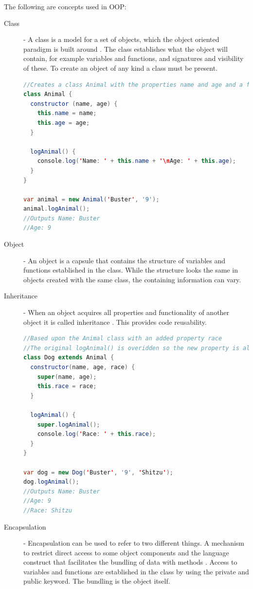 \documentclass {article}
\begin{document}
The following are concepts used in OOP:
\begin{description}
\item [Class] - A class is a model for a set of objects, which the object oriented paradigm is built around \cite{gabmar}. The class establishes what the object will contain, for example variables and functions, and signatures and visibility of these. To create an object of any kind a class must be present. 

\begin{lstlisting}[language=Java]
//Creates a class Animal with the properties name and age and a function for logging the properties to the screen
class Animal {
  constructor (name, age) {
    this.name = name;
    this.age = age;
  }

  logAnimal() {
    console.log('Name: ' + this.name + '\nAge: ' + this.age);
  }
}

var animal = new Animal('Buster', '9');
animal.logAnimal();
//Outputs Name: Buster
//Age: 9
\end{lstlisting}
\item [Object] - An object is a capsule that contains the structure of variables and functions established in the class\cite{gabmar, skansholm}. While the structure looks the same in objects created with the same class, the containing information can vary.
\item [Inheritance] - When an object acquires all properties and functionality of another object it is called inheritance \cite{skansholm}. This provides code reusability. 

\begin{lstlisting}[language=Java, breaklines=true]
//Based upon the Animal class with an added property race
//The original logAnimal() is overidden so the new property is also logged to the screen.
class Dog extends Animal {
  constructor(name, age, race) {
    super(name, age);
    this.race = race;
  }

  logAnimal() {
    super.logAnimal();
    console.log('Race: ' + this.race);
  }
}

var dog = new Dog('Buster', '9', 'Shitzu');
dog.logAnimal();
//Outputs Name: Buster
//Age: 9
//Race: Shitzu
\end{lstlisting}

\item [Encapsulation] - Encapsulation can be used to refer to two different things. A mechanism to restrict direct access to some object components and the language construct that facilitates the bundling of data with methods \cite{gabmar, skansholm}. Access to variables and functions are established in the class by using the private and public keyword. The bundling is the object itself.


\end{description}
\end{document}
